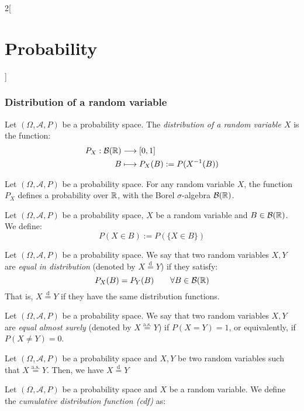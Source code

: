 \documentclass[../../../main.tex]{subfiles}
\begin{document}
\begin{multicols}{2}[\section{Probability}]
  \subsubsection*{Distribution of a random variable}
  \begin{definition}
    Let $(\Omega,\mathcal{A},P)$ be a probability space. The \textit{distribution of a random variable $X$} is the function:
    \begin{align*}
      P_X:\mathcal{B}(\mathbb{R}) & \longrightarrow [0,1]            \\
      B                    & \longmapsto P_X(B):=P(X^{-1}(B))
    \end{align*}
  \end{definition}
  \begin{prop}
    Let $(\Omega,\mathcal{A},P)$ be a probability space. For any random variable $X$, the function $P_X$ defines a probability over $\mathbb{R}$, with the Borel $\sigma$-algebra $\mathcal{B}(\mathbb{R})$.
  \end{prop}
  \begin{definition}
    Let $(\Omega,\mathcal{A},P)$ be a probability space, $X$ be a random variable and $B\in\mathcal{B}(\mathbb{R})$. We define: $$P(X\in B):=P(\{X\in B\})$$
  \end{definition}
  \begin{definition}
    Let $(\Omega,\mathcal{A},P)$ be a probability space. We say that two random variables $X,Y$ are \textit{equal in distribution} (denoted by $X\overset{\text{d}}{=}Y$) if they satisfy: $$P_X(B)=P_Y(B)\qquad\forall B\in\mathcal{B}(\mathbb{R})$$ That is, $X\overset{\text{d}}{=}Y$ if they have the same distribution functions.
  \end{definition}
  \begin{definition}
    Let $(\Omega,\mathcal{A},P)$ be a probability space. We say that two random variables $X,Y$ are \textit{equal almost surely} (denoted by $X\overset{\text{a.s.}}{=}Y$) if $P(X=Y)=1$, or equivalently, if $P(X\ne Y)=0$.
  \end{definition}
  \begin{prop}
    Let $(\Omega,\mathcal{A},P)$ be a probability space and $X,Y$ be two random variables such that $X\overset{\text{a.s.}}{=}Y$. Then, we have $X\overset{\text{d}}{=}Y$
  \end{prop}
  \begin{definition}
    Let $(\Omega,\mathcal{A},P)$ be a probability space and $X$ be a random variable. We define the \textit{cumulative distribution function (cdf)} as: \begin{align*}

\end{align*}
\end{definition}
\end{multicols}
\end{document}
